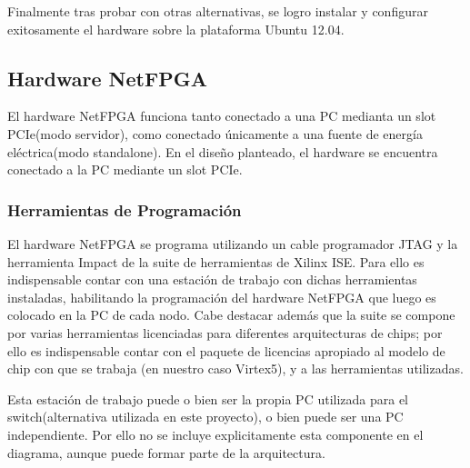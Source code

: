 Finalmente tras probar con otras alternativas, se logro instalar y configurar exitosamente el hardware sobre la plataforma Ubuntu 12.04.

\subsection{Hardware NetFPGA}

El hardware NetFPGA funciona tanto conectado a una PC medianta un slot PCIe(modo servidor), como conectado \'unicamente a una fuente de energ\'ia el\'ectrica(modo standalone). En el dise\~no planteado, el hardware se encuentra conectado a la PC mediante un slot PCIe.


\subsubsection{Herramientas de Programaci\'on}

El hardware NetFPGA se programa utilizando un cable programador JTAG y la herramienta Impact de la suite de herramientas de Xilinx ISE. Para ello es indispensable contar con una estaci\'on de trabajo con dichas herramientas instaladas, habilitando la programaci\'on  del hardware NetFPGA que luego es colocado en la PC de cada nodo. Cabe destacar adem\'as que la suite se compone por varias herramientas licenciadas para diferentes arquitecturas de chips; por ello es indispensable contar con el paquete de licencias apropiado al modelo de chip con que se trabaja (en nuestro caso Virtex5), y a las herramientas utilizadas. 

Esta estaci\'on de trabajo puede o bien ser la propia PC utilizada para el switch(alternativa utilizada en este proyecto), o bien puede ser una PC independiente. Por ello no se incluye explicitamente esta componente en el diagrama, aunque puede formar parte de la arquitectura.

